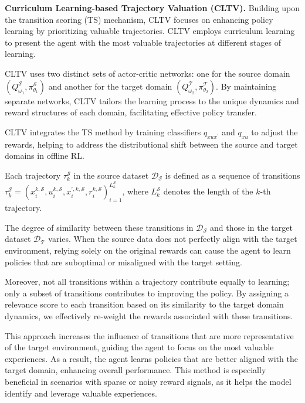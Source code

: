 \noindent\textbf{Curriculum Learning-based Trajectory Valuation (CLTV).} 
Building upon the transition scoring (TS) mechanism, CLTV focuses on enhancing policy learning by prioritizing valuable trajectories. CLTV employs curriculum learning to present the agent with the most valuable trajectories at different stages of learning. 

CLTV uses two distinct sets of actor-critic networks: one for the source domain \(\left(Q_{\omega_1}^{\mathcal{S}}, \pi_{\theta_1}^{\mathcal{S}}\right)\) and another for the target domain \(\left(Q_{\omega_2}^{\mathcal{T}}, \pi_{\theta_2}^{\mathcal{T}}\right)\). By maintaining separate networks, CLTV tailors the learning process to the unique dynamics and reward structures of each domain, facilitating effective policy transfer. 

CLTV integrates the TS method by training classifiers \(q_{xu{x}^{\prime}}\) and \(q_{xu}\) to adjust the rewards, helping to address the distributional shift between the source and target domains in offline RL. 

Each trajectory $\tau_k^{\mathcal{S}}$ in the source dataset $\mathcal{D}_{\mathcal{S}}$ is defined as a sequence of transitions $\tau_k^{\mathcal{S}}=\left(x_i^{k, \mathcal{S}}, u_i^{k, \mathcal{S}}, x_i^{\prime, k, \mathcal{S}}, r_i^{k, \mathcal{S}}\right)_{i=1}^{L_k^{\mathcal{S}}}$, where $L_k^{\mathcal{S}}$ denotes the length of the $k$-th trajectory. 

The degree of similarity between these transitions in $\mathcal{D}_{\mathcal{S}}$ and those in the target dataset $\mathcal{D}_{\mathcal{T}}$ varies. When the source data does not perfectly align with the target environment, relying solely on the original rewards can cause the agent to learn policies that are suboptimal or misaligned with the target setting. 

Moreover, not all transitions within a trajectory contribute equally to learning; only a subset of transitions contributes to improving the policy. By assigning a relevance score to each transition based on its similarity to the target domain dynamics, we effectively re-weight the rewards associated with these transitions. 

This approach increases the influence of transitions that are more representative of the target environment, guiding the agent to focus on the most valuable experiences. As a result, the agent learns policies that are better aligned with the target domain, enhancing overall performance. This method is especially beneficial in scenarios with sparse or noisy reward signals, as it helps the model identify and leverage valuable experiences.


